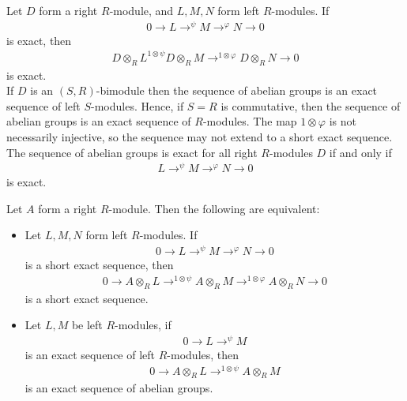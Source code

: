 \documentclass{memoir}
\begin{document}
\begin{thm}
	Let \(D\) form a right \(R\)-module, and \(L,M,N\) form left \(R\)-modules. If
	\begin{align*}
		0 \to L \to^{\psi }M \to^{\varphi }N \to 0
	\end{align*}
	is exact, then
	\begin{align*}
		D \otimes_R L ^{1 \otimes \psi }D \otimes_R M \to^{1 \otimes \varphi }D \otimes_R N \to 0
	\end{align*}
	is exact.\\

	If \(D\) is an \((S,R)\)-bimodule then the sequence of abelian groups is an exact sequence of left \(S\)-modules. Hence, if \(S = R\) is commutative, then the sequence of abelian groups is an exact sequence of \(R\)-modules. The map \(1 \otimes \varphi \) is not necessarily injective, so the sequence may not extend to a short exact sequence.\\

	The sequence of abelian groups is exact for all right \(R\)-modules \(D\) if and only if
	\begin{align*}
		L \to^{\psi }M \to^{\varphi }N \to 0
	\end{align*}
	is exact.
\end{thm}

\begin{prop}
	Let \(A\) form a right \(R\)-module. Then the following are equivalent:
	\begin{itemize}
		\item Let \(L,M,N\) form left \(R\)-modules. If
			\begin{align*}
				0 \to L \to^{\psi } M \to^{\varphi }N \to 0
			\end{align*}
			is a short exact sequence, then
			\begin{align*}
				0 \to A \otimes_R L \to^{1 \otimes \psi } A \otimes_R M \to^{1 \otimes \varphi } A \otimes_R N \to 0
			\end{align*}
			is a short exact sequence.
		\item  Let \(L,M\) be left \(R\)-modules, if
			\begin{align*}
				0 \to L \to^{\psi }M
			\end{align*} is an exact sequence of left \(R\)-modules, then
			\begin{align*}
				0 \to A \otimes_R L \to^{1 \otimes \psi } A \otimes_R M
			\end{align*} is an exact sequence of abelian groups.
	\end{itemize}
\end{prop}
\end{document}
